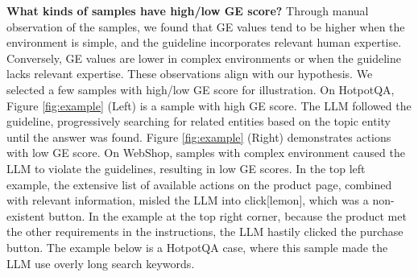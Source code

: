\textbf{What kinds of samples have high/low GE score?} Through manual observation of the samples, we found that GE values tend to be higher when the environment is simple, and the guideline incorporates relevant human expertise. Conversely, GE values are lower in complex environments or when the guideline lacks relevant expertise. These observations align with our hypothesis. We selected a few samples with high/low GE score for illustration. On HotpotQA, Figure \ref{fig:example} (Left) is a sample with high GE score. The LLM followed the guideline, progressively searching for related entities based on the topic entity until the answer was found. Figure \ref{fig:example} (Right) demonstrates actions with low GE score. On WebShop, samples with complex environment caused the LLM to violate the guidelines, resulting in low GE scores. 
In the top left example, the extensive list of available actions on the product page, combined with relevant information, misled the LLM into click[lemon], which was a non-existent button. In the example at the top right corner, because the product met the other requirements in the instructions, the LLM hastily clicked the purchase button. The example below is a HotpotQA case, where this sample made the LLM use overly long search keywords.

